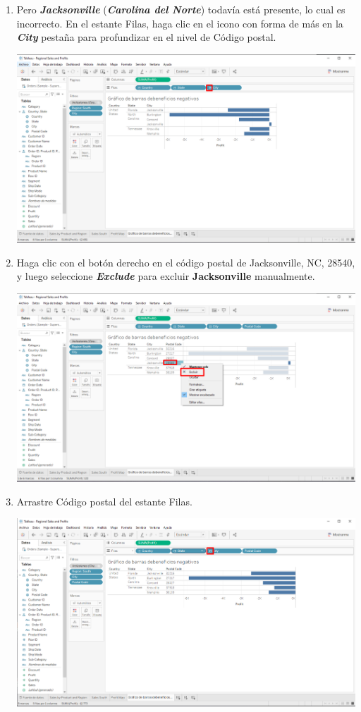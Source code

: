 \documentclass[12pt,letterpaper]{article}
\begin{document}
\begin{enumerate}
\begin{center}
        \end{center}
        \item Pero \textit{\textbf{Jacksonville}} (\textit{\textbf{Carolina del Norte}}) todavía está presente, lo cual es incorrecto. En el estante Filas, haga clic en el icono con forma de más en la \textit{\textbf{City}} pestaña para profundizar en el nivel de Código postal.
        \begin{center}
            \includegraphics[width=15cm]{./img/img53.png}
        \end{center}
        \item Haga clic con el botón derecho en el código postal de Jacksonville, NC, 28540, y luego seleccione \textit{\textbf{Exclude}} para excluir \textbf{Jacksonville} manualmente.
        \begin{center}
            \includegraphics[width=15cm]{./img/img54.png}
        \end{center}
        \item Arrastre Código postal del estante Filas.
        \begin{center}
            \includegraphics[width=15cm]{./img/img55.png}

\end{center}
\end{enumerate}
\end{document}
